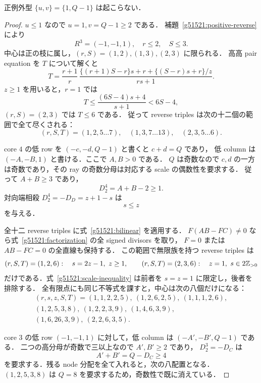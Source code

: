 \begin{proposition}\label{g51521:no-positive-exception}
正例外型 $\{u,v\}=\{1,Q-1\}$ は起こらない．
\end{proposition}
\begin{proof}
$u\le1$ なので $u=1,v=Q-1\ge2$ である．
補題~\ref{g51521:positive-reverse} により
\[
 R^3=(-1,-1,1),\quad r\le2,\quad S\le3.
\]
中心は正の枝に属し，$(r,S)=(1,2),(1,3),(2,3)$ に限られる．
高高 pair equation を $T$ について解くと
\[
 T=\frac{r+1}{r}\,
 \frac{\{(r+1)S-r\}s+r+\{(S-r)s+r\}/z}{rs+1}.
\]
$z\ge1$ を用いると，$r=1$ では
\[
 T\le\frac{(6S-4)s+4}{s+1}<6S-4,
\]
$(r,S)=(2,3)$ では $T\le6$ である．
従って reverse triples は次の十二個の範囲で全て尽くされる：
\[
 (r,S,T)=(1,2,5\ldots7),\quad (1,3,7\ldots13),\quad (2,3,5\ldots6).
\]

core $4$ の低 row を $(-c,-d,Q-1)$ と書くと $c+d=Q$ であり，
低 column は $(-A,-B,1)$ と書ける．ここで $A,B>0$ である．
$Q$ は奇数なので $c,d$ の一方は奇数であり，その ray の奇数分母は対応する scale の偶数性を要求する．
従って $A+B\ge3$ であり，
\[
 D^4_2=A+B-2\ge1.
\]
対向端相殺 $D^4_2=-D_D=z+1-s$ は
\begin{equation}\label{g51521:scale-inequality}
 s\le z
\end{equation}
を与える．

全十二 reverse triples に式~\eqref{g51521:bilinear} を適用する．
$F(AB-FC)\ne0$ なら式~\eqref{g51521:factorization} の全 signed divisors を取り，
$F=0$ または $AB-FC=0$ の全直線も保持する．
この範囲で無限族を持つ reverse triples は
\[
 (r,S,T)=(1,2,6):\quad s=2z-1,\ z\ge1,
 \qquad
 (r,S,T)=(2,3,6):\quad z=1,\ s\in2\mathbb Z_{>0}
\]
だけである．式~\eqref{g51521:scale-inequality} は前者を $s=z=1$ に限定し，後者を排除する．
全有限点にも同じ不等式を課すと，中心は次の八個だけになる：
\[
 \begin{gathered}
 (r,s,z,S,T)=(1,1,2,2,5),\ (1,2,6,2,5),\ (1,1,1,2,6),\\
 (1,2,5,3,8),\ (1,2,2,3,9),\ (1,4,6,3,9),\\
 (1,6,26,3,9),\ (2,2,6,3,5).
 \end{gathered}
\]

core $3$ の低 row $(-1,-1,1)$ に対して，低 column は $(-A',-B',Q-1)$ である．
二つの高分母が奇数で三以上なので $A',B'\ge2$ であり，
$D^3_2=-D_C$ は
\begin{equation}\label{g51521:positive-low-D-obstruction}
 A'+B'=Q-D_C\ge4
\end{equation}
を要求する．残る node 分配を全て入れると，次の八配置となる．
$(1,2,5,3,8)$ は $Q=8$ を要求するため，奇数性で既に消えている．


\end{proof}
